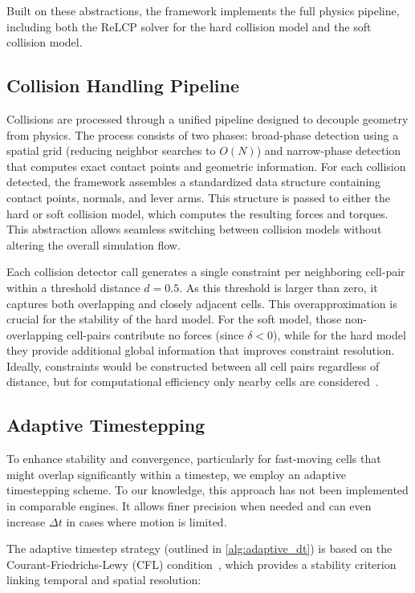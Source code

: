 \documentclass[conference]{IEEEtran}
\begin{document}
Built on these abstractions, the framework implements the full physics pipeline, including both the ReLCP solver for the hard collision model and the soft collision model.

\subsection{Collision Handling Pipeline}

Collisions are processed through a unified pipeline designed to decouple geometry from physics. The process consists of two phases: broad-phase detection using a spatial grid (reducing neighbor searches to $O(N)$) and narrow-phase detection that computes exact contact points and geometric information. For each collision detected, the framework assembles a standardized data structure containing contact points, normals, and lever arms. This structure is passed to either the hard or soft collision model, which computes the resulting forces and torques. This abstraction allows seamless switching between collision models without altering the overall simulation flow.

Each collision detector call generates a single constraint per neighboring cell-pair within a threshold distance $d = 0.5$. As this threshold is larger than zero, it captures both overlapping and closely adjacent cells. This overapproximation is crucial for the stability of the hard model. For the soft model, those non-overlapping cell-pairs contribute no forces (since $\delta < 0$), while for the hard model they provide additional global information that improves constraint resolution. Ideally, constraints would be constructed between all cell pairs regardless of distance, but for computational efficiency only nearby cells are considered~\cite{Yan2019, Yan2022}.

\subsection{Adaptive Timestepping}

To enhance stability and convergence, particularly for fast-moving cells that might overlap significantly within a timestep, we employ an adaptive timestepping scheme. To our knowledge, this approach has not been implemented in comparable engines. It allows finer precision when needed and can even increase $\Delta t$ in cases where motion is limited.

The adaptive timestep strategy (outlined in \autoref{alg:adaptive_dt}) is based on the Courant-Friedrichs-Lewy (CFL) condition~\cite{Courant1928}, which provides a stability criterion linking temporal and spatial resolution:
\end{document}
